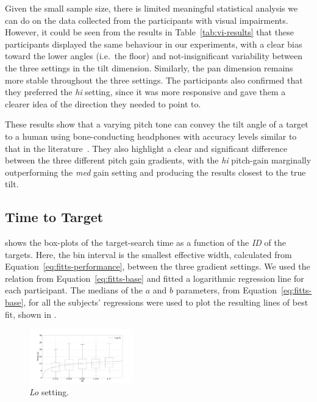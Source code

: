 \documentclass[sigconf, review=true, screen=true, anonymous=true]{acmart}
\begin{document}
Given the small sample size, there is limited meaningful statistical analysis we can do on the data collected from the participants with visual impairments.
However, it could be seen from the results in Table~\ref{tab:vi-results} that these participants displayed the same behaviour in our experiments, with a clear bias toward the lower angles (i.e.\ the floor) and not-insignificant variability between the three settings in the tilt dimension.
Similarly, the pan dimension remains more stable throughout the three settings.
The participants also confirmed that they preferred the \emph{hi} setting, since it was more responsive and gave them a clearer idea of the direction they needed to point to. 

These results show that a varying pitch tone can convey the tilt angle of a target to a human using bone-conducting headphones with accuracy levels similar to that in the literature~\cite{bujacz2011sonification, katz2011spatial, zotkin2004rendering}. They also highlight a clear and significant difference between the three different pitch gain gradients, with the \emph{hi} pitch-gain marginally outperforming the \emph{med} gain setting and producing the results closest to the true tilt. 

\subsection{Time to Target}

 shows the box-plots of the target-search time as a function of the \emph{ID} of the targets.
Here, the bin interval is the smallest effective width, calculated from Equation~\ref{eq:fitts-performance}, between the three gradient settings.
We used the relation from Equation~\ref{eq:fitts-base} and fitted a logarithmic regression line for each participant.
The medians of the $a$ and $b$ parameters, from Equation~\ref{eq:fitts-base}, for all the subjects' regressions were used to plot the resulting lines of best fit, shown in . 

\begin{figure}
  \centering
  \includegraphics[clip, trim=120 20 120 20, width=0.4\textwidth]{figures/fitts_lo.png}
  \caption{\emph{Lo} setting. }\label{fig:fitts-lo}
\end{figure}
\end{document}
